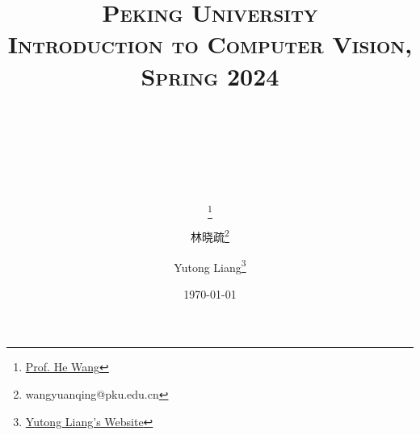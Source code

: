

\title{
{\normalfont\normalsize\textsc{
Peking University\\
Introduction to Computer Vision, Spring 2024 \\[25pt]}}
\horrule{0.5pt}\\
\\
\horrule{1.8pt}\\[20pt]
}

\author[1]{\thanks{\href{https://hughw19.github.io/}{Prof. He Wang}}}
\author[2]{林晓疏\thanks{wangyuanqing@pku.edu.cn}}
\author[2]{Yutong Liang\thanks{\href{https://lyt0112.com/}{Yutong Liang's Website}}}

\date{\today}

\pagestyle{fancy}
\fancyhf{}
\fancyhead[L]{\leftmark}  %
\fancyfoot[C]{\thepage}  %



	\maketitle
	
	\clearpage
	\tableofcontents
	
	
	
	
	
	
	
	
	
	
	
	
	
	
	
	
	
	
	
	
	
	
	
	
	


	\clearpage
	\appendix
	
	
		
	

    
    
